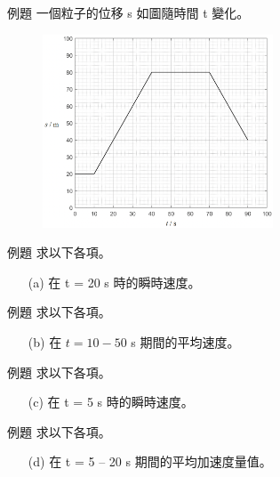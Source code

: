 \documentclass[beamer=true]{standalone}
\begin{document}
\begin{frame}[t]{例題}
    一個粒子的位移 s 如圖隨時間 t 變化。
    \begin{figure}[h!]
        \centering
        \includegraphics[width=0.61\textwidth]{../../assets/07c55dd0.png}
    \end{figure}
\end{frame}
\begin{frame}[t]{例題}
    求以下各項。
    \begin{itemize}
        \item [(a)]在 t = 20 s 時的瞬時速度。
    \end{itemize}
\end{frame}
\begin{frame}[t]{例題}
    求以下各項。
    \begin{itemize}
        \item [(b)]在 $t = 10-50 $ \unit{s} 期間的平均速度。
    \end{itemize}
\end{frame}
\begin{frame}[t]{例題}
    求以下各項。
    \begin{itemize}
        \item [(c)]在 t = 5 s 時的瞬時速度。
    \end{itemize}
\end{frame}
\begin{frame}[t]{例題}
    求以下各項。
    \begin{itemize}
        \item [(d)]在 t = 5 – 20 s 期間的平均加速度量值。
    \end{itemize}
\end{frame}
\end{document}
